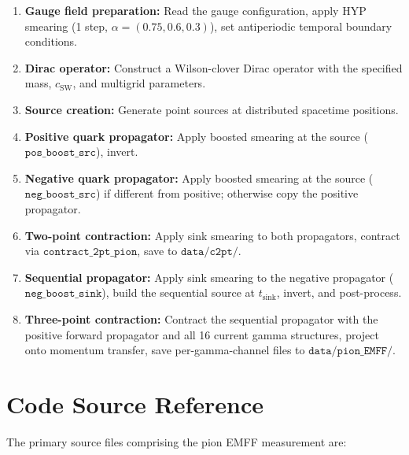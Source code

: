 \documentclass[11pt,a4paper]{article}
\begin{document}
\begin{enumerate}[nosep]
  \item \textbf{Gauge field preparation:} Read the gauge configuration, apply
        HYP smearing (1 step, \(\alpha = (0.75, 0.6, 0.3)\)), set antiperiodic
        temporal boundary conditions.
  \item \textbf{Dirac operator:} Construct a Wilson-clover Dirac operator with
        the specified mass, \(c_{\text{SW}}\), and multigrid parameters.
  \item \textbf{Source creation:} Generate point sources at distributed
        spacetime positions.
  \item \textbf{Positive quark propagator:} Apply boosted smearing at the source
        (\(\texttt{pos\_boost\_src}\)), invert.
  \item \textbf{Negative quark propagator:} Apply boosted smearing at the source
        (\(\texttt{neg\_boost\_src}\)) if different from positive; otherwise
        copy the positive propagator.
  \item \textbf{Two-point contraction:} Apply sink smearing to both propagators,
        contract via \(\texttt{contract\_2pt\_pion}\), save to
        \(\texttt{data/c2pt/}\).
  \item \textbf{Sequential propagator:} Apply sink smearing to the negative
        propagator (\(\texttt{neg\_boost\_sink}\)), build the sequential source
        at \(t_{\text{sink}}\), invert, and post-process.
  \item \textbf{Three-point contraction:} Contract the sequential propagator
        with the positive forward propagator and all 16 current gamma
        structures, project onto momentum transfer, save per-gamma-channel
        files to \(\texttt{data/pion\_EMFF/}\).
\end{enumerate}


\section{Code Source Reference}

The primary source files comprising the pion EMFF measurement are:
\end{document}
